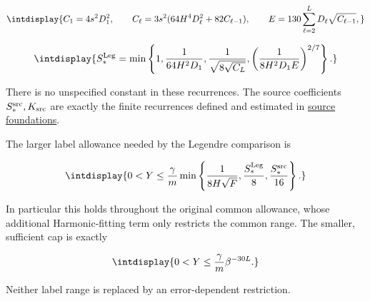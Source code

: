 \begingroup\renewcommand{\theHequation}{intdisplay.110}
\begin{equation*}
\intdisplay{
C_1=4s^2D_1^2,\qquad
C_\ell=3s^2(64H^4D_\ell^2+82C_{\ell-1}),\qquad
E=130\sum_{\ell=2}^LD_\ell\sqrt{C_{\ell-1}},
}
\end{equation*}
\endgroup

\begingroup\renewcommand{\theHequation}{intdisplay.111}
\begin{equation}
\intdisplay{
S_*^{\rm Leg}=\min\left\{1,\frac1{64H^2D_1},
\frac1{\sqrt{8\sqrt{C_L}}},
\left(\frac1{8H^2D_1E}\right)^{2/7}\right\}.
}
\label{int:eq-0033-legendre-fitting-coefficients}
\end{equation}
\endgroup


There is no unspecified constant in these recurrences. The source coefficients \(S_*^{\rm src},\allowbreak K_{\rm src}\) are exactly the finite recurrences defined and estimated in \hyperref[int:source-foundations]{source foundations}.



The larger label allowance needed by the Legendre comparison is


\begingroup\renewcommand{\theHequation}{intdisplay.112}
\begin{equation}
\intdisplay{
0<Y\le\frac\gamma m
\min\left\{\frac1{8H\sqrt F},\frac{S_*^{\rm Leg}}8,
\frac{S_*^{\rm src}}{16}\right\}.
}
\label{int:eq-0034-legendre-full-labels}
\end{equation}
\endgroup


In particular this holds throughout the original common allowance, whose additional Harmonic-fitting term only restricts the common range. The smaller, sufficient cap is exactly


\begingroup\renewcommand{\theHequation}{intdisplay.113}
\begin{equation}
\intdisplay{
0<Y\le\frac\gamma m\beta^{-30L}.
}
\label{int:eq-0035-legendre-simple-labels}
\end{equation}
\endgroup


Neither label range is replaced by an error-dependent restriction.



